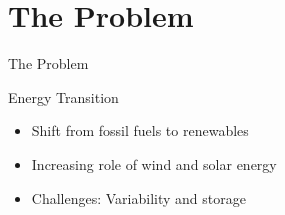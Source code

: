 





\section{The Problem}

\begin{frame}{The Problem}
\end{frame}

\begin{frame}{Energy Transition}
    \begin{itemize}
        \item Shift from fossil fuels to renewables
        \item Increasing role of wind and solar energy
        \item Challenges: Variability and storage
    \end{itemize}
\end{frame}

